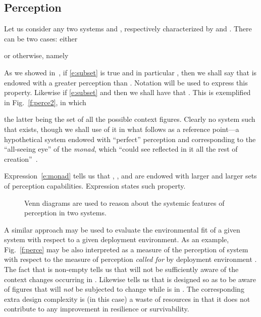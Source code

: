 \documentclass[twocolumn]{svjour3}
\begin{document}
\subsection{Perception}

Let us consider any two systems  and , respectively characterized by  and .
There can be two cases: either 

or otherwise, namely

As we showed in~\cite{DF13b}, if \eqref{e:subset} is true and in particular ,
then we shall say that  is endowed with a greater perception than .
Notation
 will be used to express this property.
Likewise if \eqref{e:subset} and  then we shall have that .
This is exemplified in Fig.~\ref{f:perce2}, in which 

the latter being the set of all the possible context figures.
Clearly no system  such that  exists,
though we shall use of it in what follows as a reference point---a hypothetical
system endowed with ``perfect'' perception and
corresponding to the ``all-seeing eye''
of the \emph{monad}, which ``could see reflected in it all the rest of creation''~\cite{leibniz2006shorter}.

Expression~\eqref{e:monad} tells us that
, , and  are endowed with larger
and larger sets of perception capabilities.
Expression  states such property.






\begin{figure*}[ht!]
\begin{center}
\hspace*{4pt}
\end{center}
\caption{Venn diagrams are used to reason about the systemic features of perception in two systems.}
\end{figure*}


A similar approach may be 
used to evaluate the environmental fit
of a given system with respect to a given deployment environment.
As an example, Fig.~\ref{f:perce} may be also interpreted as a measure of the
perception of system  with respect to the measure of perception
\emph{called for\/} by deployment environment . The fact that  is non-empty
tells us that  will not be sufficiently aware
of the context changes occurring in . Likewise  tells us that  is designed
so as to be aware of figures that will \emph{not\/} be subjected to change while  is in .
The corresponding extra design complexity is (in this case)
a waste of resources in that it does not contribute to any improvement in resilience or survivability.
\end{document}
